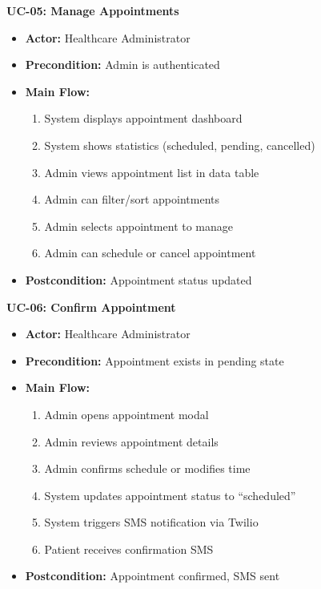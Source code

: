 \documentclass[11pt,a4paper]{article}
\begin{document}
\textbf{UC-05: Manage Appointments}
\begin{itemize}
    \item \textbf{Actor:} Healthcare Administrator
    \item \textbf{Precondition:} Admin is authenticated
    \item \textbf{Main Flow:}
    \begin{enumerate}
        \item System displays appointment dashboard
        \item System shows statistics (scheduled, pending, cancelled)
        \item Admin views appointment list in data table
        \item Admin can filter/sort appointments
        \item Admin selects appointment to manage
        \item Admin can schedule or cancel appointment
    \end{enumerate}
    \item \textbf{Postcondition:} Appointment status updated
\end{itemize}

\textbf{UC-06: Confirm Appointment}
\begin{itemize}
    \item \textbf{Actor:} Healthcare Administrator
    \item \textbf{Precondition:} Appointment exists in pending state
    \item \textbf{Main Flow:}
    \begin{enumerate}
        \item Admin opens appointment modal
        \item Admin reviews appointment details
        \item Admin confirms schedule or modifies time
        \item System updates appointment status to ``scheduled''
        \item System triggers SMS notification via Twilio
        \item Patient receives confirmation SMS
    \end{enumerate}
    \item \textbf{Postcondition:} Appointment confirmed, SMS sent
\end{itemize}
\end{document}
